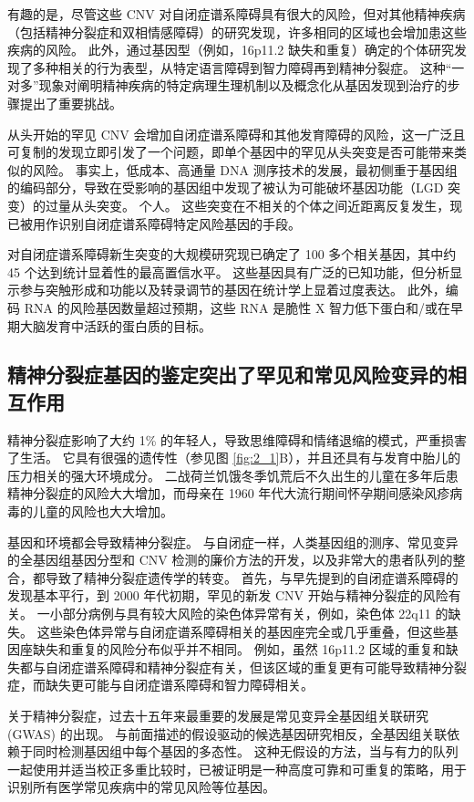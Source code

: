 有趣的是，尽管这些 CNV 对自闭症谱系障碍具有很大的风险，但对其他精神疾病（包括精神分裂症和双相情感障碍）的研究发现，许多相同的区域也会增加患这些疾病的风险。 
此外，通过基因型（例如，16p11.2 缺失和重复）确定的个体研究发现了多种相关的行为表型，从特定语言障碍到智力障碍再到精神分裂症。 
这种“一对多”现象对阐明精神疾病的特定病理生理机制以及概念化从基因发现到治疗的步骤提出了重要挑战。


从头开始的罕见 CNV 会增加自闭症谱系障碍和其他发育障碍的风险，这一广泛且可复制的发现立即引发了一个问题，即单个基因中的罕见从头突变是否可能带来类似的风险。 
事实上，低成本、高通量 DNA 测序技术的发展，最初侧重于基因组的编码部分，导致在受影响的基因组中发现了被认为可能破坏基因功能（LGD 突变）的过量从头突变。 
个人。 这些突变在不相关的个体之间近距离反复发生，现已被用作识别自闭症谱系障碍特定风险基因的手段。


对自闭症谱系障碍新生突变的大规模研究现已确定了 100 多个相关基因，其中约 45 个达到统计显着性的最高置信水平。 
这些基因具有广泛的已知功能，但分析显示参与突触形成和功能以及转录调节的基因在统计学上显着过度表达。 
此外，编码 RNA 的风险基因数量超过预期，这些 RNA 是脆性 X 智力低下蛋白和/或在早期大脑发育中活跃的蛋白质的目标。


\subsection{精神分裂症基因的鉴定突出了罕见和常见风险变异的相互作用}

精神分裂症影响了大约 1\% 的年轻人，导致思维障碍和情绪退缩的模式，严重损害了生活。 
它具有很强的遗传性（参见图 \ref{fig:2_1}B），并且还具有与发育中胎儿的压力相关的强大环境成分。 
二战荷兰饥饿冬季饥荒后不久出生的儿童在多年后患精神分裂症的风险大大增加，而母亲在 1960 年代大流行期间怀孕期间感染风疹病毒的儿童的风险也大大增加。


基因和环境都会导致精神分裂症。 
与自闭症一样，人类基因组的测序、常见变异的全基因组基因分型和 CNV 检测的廉价方法的开发，以及非常大的患者队列的整合，都导致了精神分裂症遗传学的转变。 
首先，与早先提到的自闭症谱系障碍的发现基本平行，到 2000 年代初期，罕见的新发 CNV 开始与精神分裂症的风险有关。 
一小部分病例与具有较大风险的染色体异常有关，例如，染色体 22q11 的缺失。 
这些染色体异常与自闭症谱系障碍相关的基因座完全或几乎重叠，但这些基因座缺失和重复的风险分布似乎并不相同。 
例如，虽然 16p11.2 区域的重复和缺失都与自闭症谱系障碍和精神分裂症有关，但该区域的重复更有可能导致精神分裂症，而缺失更可能与自闭症谱系障碍和智力障碍相关。


关于精神分裂症，过去十五年来最重要的发展是常见变异全基因组关联研究 (GWAS) 的出现。 
与前面描述的假设驱动的候选基因研究相反，全基因组关联依赖于同时检测基因组中每个基因的多态性。 
这种无假设的方法，当与有力的队列一起使用并适当校正多重比较时，已被证明是一种高度可靠和可重复的策略，用于识别所有医学常见疾病中的常见风险等位基因。


